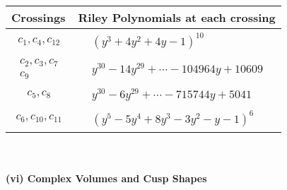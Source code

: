 \documentclass[1p]{elsarticle_modified}
\theoremstyle{definition}
\begin{document}
\begin{tabular}{m{50pt}|m{274pt}}
Crossings & \hspace{64pt}Riley Polynomials at each crossing \\
\hline $$\begin{aligned}c_{1},c_{4},c_{12}\end{aligned}$$&$\begin{aligned}
&(y^3+4 y^2+4 y-1)^{10}
\end{aligned}$\\
\hline $$\begin{aligned}c_{2},c_{3},c_{7}\\c_{9}\end{aligned}$$&$\begin{aligned}
&y^{30}-14 y^{29}+\cdots-104964 y+10609
\end{aligned}$\\
\hline $$\begin{aligned}c_{5},c_{8}\end{aligned}$$&$\begin{aligned}
&y^{30}-6 y^{29}+\cdots-715744 y+5041
\end{aligned}$\\
\hline $$\begin{aligned}c_{6},c_{10},c_{11}\end{aligned}$$&$\begin{aligned}
&(y^5-5 y^4+8 y^3-3 y^2- y-1)^6
\end{aligned}$\\
\hline
\end{tabular}\\~\\
\newpage\flushleft \textbf{(vi) Complex Volumes and Cusp Shapes}
\end{document}
